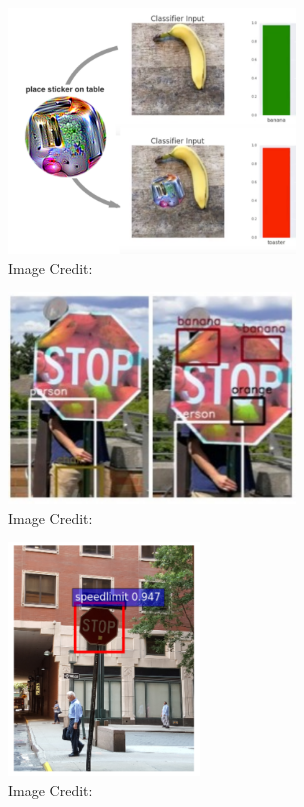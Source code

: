 \documentclass[10pt]{beamer}
\begin{document}
\begin{frame}[fragile]{}
  \begin{figure}
  \centering
  \includegraphics[width=3in]{patch.png} \\
  \footnotesize Image Credit: \cite{BrownMRAG17}
  \end{figure}
\end{frame}

\begin{frame}[fragile]{}
  \begin{figure}
  \centering
  \includegraphics[width=3in]{patch_sign.png} \\
  \footnotesize Image Credit: \cite{SongEEF0RTPK18}
  \end{figure}
\end{frame}

\begin{frame}[fragile]{}
  \begin{figure}
  \centering
  \includegraphics[width=2in]{backdoor.png} \\
  \footnotesize Image Credit: \cite{GuLDG19}
  \end{figure}
\end{frame}
\end{document}
